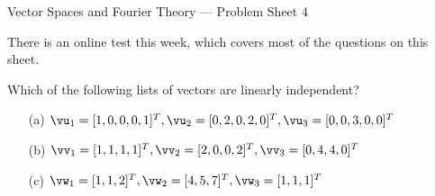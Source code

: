 


\begin{center}
 {\huge Vector Spaces and Fourier Theory ---
   Problem Sheet 4
 }
\end{center}

\begin{rubric}
 There is an online test this week, which covers most of the
 questions on this sheet.
\end{rubric}
\begin{exercise}\label{ex-check-independence}
 Which of the following lists of vectors are linearly
 independent?\\[0.1ex]
 \begin{itemize}\renewcommand{\itemsep}{1ex}
  \item[(a)]
   $\vu_1=[1,0,0,0,1]^T,\vu_2=[0,2,0,2,0]^T,\vu_3=[0,0,3,0,0]^T$
  \item[(b)]
   $\vv_1=[1,1,1,1]^T,\vv_2=[2,0,0,2]^T,\vv_3=[0,4,4,0]^T$
  \item[(c)]
   $\vw_1=[1,1,2]^T,\vw_2=[4,5,7]^T,\vw_3=[1,1,1]^T$ 
 \end{itemize}
\end{exercise}

